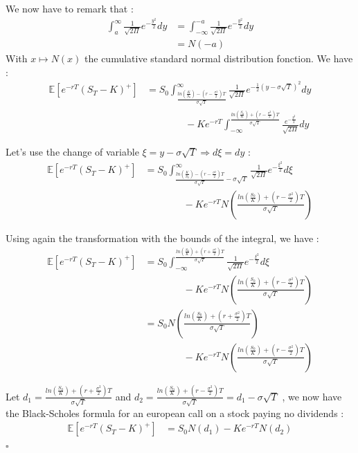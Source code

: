 \documentclass[hidelinks]{article}
\newcommand{\esp}{\mathbb{E}\left[e^{-rT}(S_{T}-K)^{+}\right]}
\newcommand{\ddd}{\frac{ln\left(\frac{K}{S_{0}}\right)-\left(r-\frac{\sigma^{2}}{2}\right) T}{\sigma \sqrt{T}}}
\newcommand{\dddd}{\frac{ln\left(\frac{S_{0}}{K}\right)+\left(r-\frac{\sigma^{2}}{2}\right) T}{\sigma \sqrt{T}}}
\newcommand{\ddddd}{\frac{ln\left(\frac{K}{S_{0}}\right)-\left(r-\frac{\sigma^{2}}{2}\right) T}{\sigma \sqrt{T}}-\sigma\sqrt{T}}
\newcommand{\dddddd}{\frac{ln\left(\frac{S_{0}}{K}\right)+\left(r+\frac{\sigma^{2}}{2}\right) T}{\sigma \sqrt{T}}}
\newcommand*{\QEDB}{\hfill\ensuremath{\square}}
\newenvironment{nalign}{
    \begin{equation}
    \begin{aligned}
}{
    \end{aligned}
    \end{equation}
    \ignorespacesafterend
}
\begin{document}
We now have to remark that :
\begin{equation}
    \begin{split}
    \int_{a}^{\infty} \frac{1}{\sqrt{2\Pi}}e^{-\frac{y^{2}}{2}} dy & =  \int_{-\infty}^{-a} \frac{1}{\sqrt{2\Pi}}e^{-\frac{y^{2}}{2}} dy 
    \\ & = N(-a)
    \end{split}
    \end{equation}
With $x \mapsto N(x)$ the cumulative standard normal distribution fonction. We have :
\begin{nalign}
    \esp & = S_{0} \int_{\ddd}^{\infty} \frac{1}{\sqrt{2\Pi}} e^{-\frac{1}{2}\left( y - \sigma\sqrt{T}\right)^{2}} dy
    \\ & \qquad\qquad - K  e^{-rT}\int_{-\infty}^{\dddd} \frac{e^{-\frac{y^{2}}{2}}}{\sqrt{2\Pi}} dy 
    \end{nalign}
    
    Let's use the change of variable $\xi=y-\sigma\sqrt{T} \Rightarrow d\xi=dy$ :
    \begin{equation}
    \begin{split}
    \esp & = S_{0} \int_{\ddddd}^{\infty} \frac{1}{\sqrt{2\Pi}} e^{-\frac{\xi^{2}}{2}} d\xi
    \\ & \qquad\qquad - K  e^{-rT}N\left( \dddd \right)
    \end{split}
    \end{equation}
    
    \newpage
    Using again the transformation with the bounds of the integral, we have :
    \begin{equation}
    \begin{split}
    \esp & = S_{0} \int_{-\infty}^{\dddddd} \frac{1}{\sqrt{2\Pi}} e^{-\frac{\xi^{2}}{2}} d\xi
    \\ & \qquad\qquad - K  e^{-rT}N\left( \dddd \right)
    \\ & = S_{0} N\left(\dddddd \right) \\ &  \qquad\qquad- K  e^{-rT}N\left( \dddd \right)
    \end{split}
    \end{equation}
    
    Let $d_{1}= \dddddd$ and $d_{2}=\dddd=d_{1}-\sigma\sqrt{T}$ , we now have the Black-Scholes formula for an european call on a stock paying no dividends :
    \begin{equation}
    \begin{split}
    \esp & = S_{0}N\left( d_{1} \right) - K e^{-rT}N\left( d_{2} \right)
    \end{split}
    \end{equation}
    \QEDB
\end{document}
